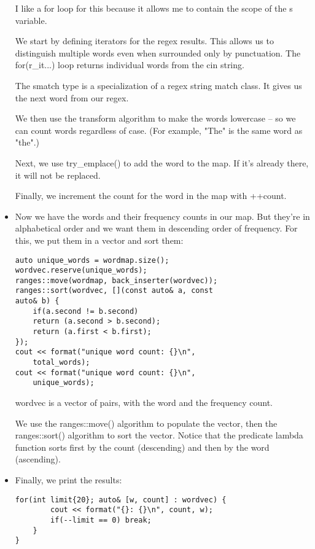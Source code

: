\begin{itemize}
I like a for loop for this because it allows me to contain the scope of the s variable.

We start by defining iterators for the regex results. This allows us to distinguish multiple words even when surrounded only by punctuation. The for(r\_it...) loop returns individual words from the cin string.

The smatch type is a specialization of a regex string match class. It gives us the next word from our regex.

We then use the transform algorithm to make the words lowercase – so we can count words regardless of case. (For example, "The" is the same word as "the".) 

Next, we use try\_emplace() to add the word to the map. If it's already there, it will not be replaced.

Finally, we increment the count for the word in the map with ++count.

\item 
Now we have the words and their frequency counts in our map. But they're in alphabetical order and we want them in descending order of frequency. For this, we put them in a vector and sort them:

\begin{lstlisting}[style=styleCXX]
auto unique_words = wordmap.size();
wordvec.reserve(unique_words);
ranges::move(wordmap, back_inserter(wordvec));
ranges::sort(wordvec, [](const auto& a, const
auto& b) {
	if(a.second != b.second)
	return (a.second > b.second);
	return (a.first < b.first);
});
cout << format("unique word count: {}\n",
	total_words);
cout << format("unique word count: {}\n",
	unique_words);
\end{lstlisting}

wordvec is a vector of pairs, with the word and the frequency count.

We use the ranges::move() algorithm to populate the vector, then the ranges::sort() algorithm to sort the vector. Notice that the predicate lambda function sorts first by the count (descending) and then by the word (ascending).

\item 
Finally, we print the results:

\begin{lstlisting}[style=styleCXX]
	for(int limit{20}; auto& [w, count] : wordvec) {
		cout << format("{}: {}\n", count, w);
		if(--limit == 0) break;
	}
}
\end{lstlisting}


\end{itemize}
